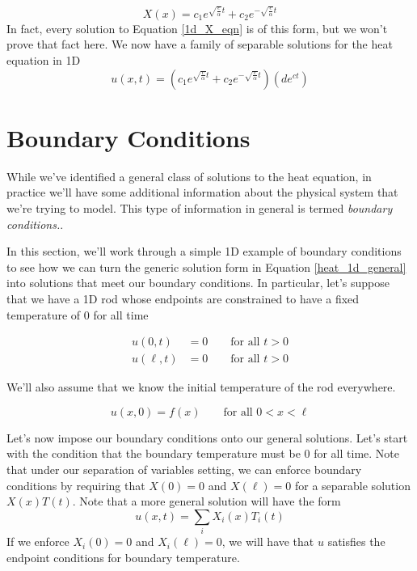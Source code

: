 \documentclass[book.tex]{subfiles}
\begin{document}
\begin{equation}
    X(x) = c_1 e^{\sqrt{\frac{c}{\alpha}}t} + c_2 e^{-\sqrt{\frac{c}{\alpha}}t}
\end{equation}
In fact, every solution to Equation \ref{1d_X_eqn} is of this form, but we won't prove that fact here. We now have a family of separable solutions for the heat equation in 1D
\begin{equation}
    u(x, t) = \left (c_1 e^{\sqrt{\frac{c}{\alpha}}t} + c_2 e^{-\sqrt{\frac{c}{\alpha}}t} \right ) \left (d e^{ct} \right)
    \label{heat_1d_general}
\end{equation}

\section{Boundary Conditions}
While we've identified a general class of solutions to the heat equation, in practice we'll have some additional information about the physical system that we're trying to model. This type of information in general is termed \textit{boundary conditions.}.

In this section, we'll work through a simple 1D example of boundary conditions to see how we can turn the generic solution form in Equation \ref{heat_1d_general} into solutions that meet our boundary conditions. In particular, let's suppose that we have a 1D rod whose endpoints are constrained to have a fixed temperature of $0$ for all time

\begin{align}
u(0, t) &= 0 \qquad \textrm{for all } t > 0 \\
u(\ell, t) &= 0 \qquad \textrm{for all } t > 0
\end{align}

We'll also assume that we know the initial temperature of the rod everywhere.

\begin{equation}
    u(x, 0) = f(x) \qquad \textrm{for all } 0 < x < \ell
\end{equation}

Let's now impose our boundary conditions onto our general solutions. Let's start with the condition that the boundary temperature must be $0$ for all time. Note that under our separation of variables setting, we can enforce boundary conditions by requiring that $X(0) = 0$ and $X(\ell) = 0$ for a separable solution $X(x)T(t)$. Note that a more general solution will have the form
\begin{equation}
    u(x, t) = \sum_i X_i(x)T_i(t)
\end{equation}
If we enforce $X_i(0) = 0$ and $X_i(\ell) = 0$, we will have that $u$ satisfies the endpoint conditions for boundary temperature. %
\end{document}
